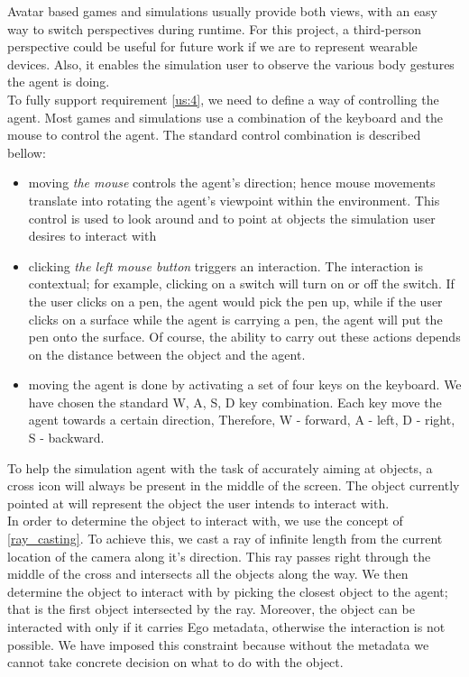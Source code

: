 Avatar based games and simulations usually provide both views, with an easy way to switch perspectives during runtime. For this project, a third-person perspective could be useful for future work if we are to represent wearable devices. Also, it enables the simulation user to observe the various body gestures the agent is doing.\\

To fully support requirement \ref{us:4}, we need to define a way of controlling the agent. Most games and simulations use a combination of the keyboard and the mouse to control the agent. The standard control combination is described bellow:
\begin{itemize}
	\item moving \emph{the mouse} controls the agent's direction; hence mouse movements translate into rotating the agent's viewpoint within the environment. This control is used to look around and to point at objects the simulation user desires to interact with
	\item clicking \emph{the left mouse button} triggers an interaction. The interaction is contextual; for example, clicking on a switch will turn on or off the switch. If the user clicks on a pen, the agent would pick the pen up, while if the user clicks on a surface while the agent is carrying a pen, the agent will put the pen onto the surface. Of course, the ability to carry out these actions depends on the distance between the object and the agent.
	\item moving the agent is done by activating a set of four keys on the keyboard. We have chosen the standard W, A, S, D key combination. Each key move the agent towards a certain direction, Therefore, W - forward, A - left, D - right, S - backward.
\end{itemize}

To help the simulation agent with the task of accurately aiming at objects, a cross icon will always be present in the middle of the screen. The object currently pointed at will represent the object the user intends to interact with.\\

In order to determine the object to interact with, we use the concept of \ref{ray_casting}. To achieve this, we cast a ray of infinite length from the current location of the camera along it's direction. This ray passes right through the middle of the cross and intersects all the objects along the way. We then determine the object to interact with by picking the closest object to the agent; that is the first object intersected by the ray. Moreover, the object can be interacted with only if it carries Ego metadata, otherwise the interaction is not possible. We have imposed this constraint because without the metadata we cannot take concrete decision on what to do with the object.\\


